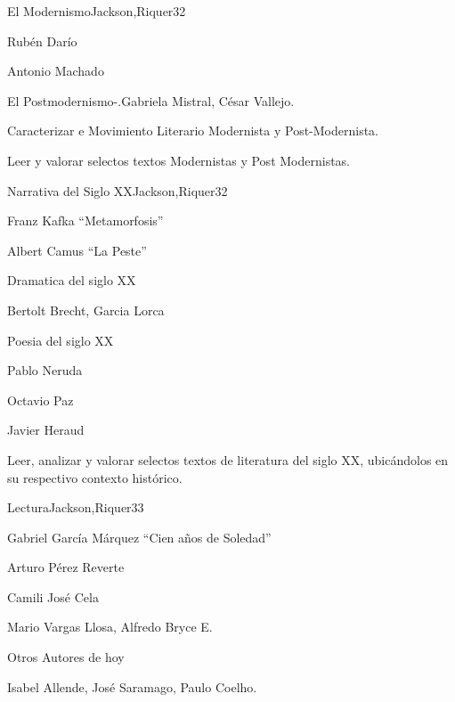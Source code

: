 \begin{syllabus}
\begin{unit}{El Modernismo}{Jackson,Riquer}{3}{2}
\begin{topics}
	\item Rubén Darío
	\item Antonio Machado
	\item El Postmodernismo-.Gabriela Mistral, César Vallejo.
\end{topics}
\begin{unitgoals}
	\item Caracterizar e Movimiento Literario Modernista y Post-Modernista.
	\item Leer y valorar selectos textos Modernistas y Post Modernistas.
\end{unitgoals}
\end{unit}

\begin{unit}{Narrativa del Siglo XX}{Jackson,Riquer}{3}{2}
\begin{topics}
	\item Franz Kafka ``Metamorfosis''
	\item Albert Camus ``La Peste''
	\item Dramatica del siglo XX
	\item Bertolt Brecht, Garcia Lorca
	\item Poesia del siglo XX
	\item Pablo Neruda
	\item Octavio Paz
	\item Javier Heraud
\end{topics}
\begin{unitgoals}
	\item Leer, analizar y valorar selectos textos de literatura del siglo XX, ubicándolos en su respectivo contexto histórico.
\end{unitgoals}
\end{unit}

\begin{unit}{Lectura}{Jackson,Riquer}{3}{3}
\begin{topics}
	\item Gabriel García Márquez ``Cien años de Soledad''
	\item Arturo Pérez Reverte
	\item Camili José Cela
	\item Mario Vargas Llosa, Alfredo Bryce E.
	\item Otros Autores de hoy
	\item Isabel Allende, José Saramago, Paulo Coelho.
\end{topics}
\end{unit}



\begin{coursebibliography}
\end{coursebibliography}
\end{syllabus}

